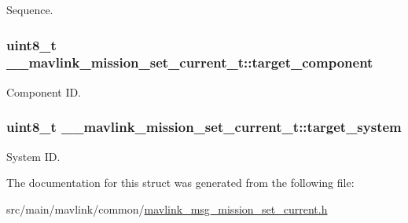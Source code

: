 Sequence. 

\hypertarget{struct____mavlink__mission__set__current__t_a367ad0a39fa1fc6d06ee1aa06a9a6908}{
\subsubsection[{target\+\_\+component}]{\setlength{\rightskip}{0pt plus 5cm}uint8\+\_\+t \+\_\+\+\_\+mavlink\+\_\+mission\+\_\+set\+\_\+current\+\_\+t\+::target\+\_\+component}}\label{struct____mavlink__mission__set__current__t_a367ad0a39fa1fc6d06ee1aa06a9a6908}


Component I\+D. 

\hypertarget{struct____mavlink__mission__set__current__t_aa9499477334421047ddb7b3d8e4b7794}{
\subsubsection[{target\+\_\+system}]{\setlength{\rightskip}{0pt plus 5cm}uint8\+\_\+t \+\_\+\+\_\+mavlink\+\_\+mission\+\_\+set\+\_\+current\+\_\+t\+::target\+\_\+system}}\label{struct____mavlink__mission__set__current__t_aa9499477334421047ddb7b3d8e4b7794}


System I\+D. 



The documentation for this struct was generated from the following file\+:\begin{DoxyCompactItemize}
\item 
src/main/mavlink/common/\hyperlink{mavlink__msg__mission__set__current_8h}{mavlink\+\_\+msg\+\_\+mission\+\_\+set\+\_\+current.\+h}\end{DoxyCompactItemize}
